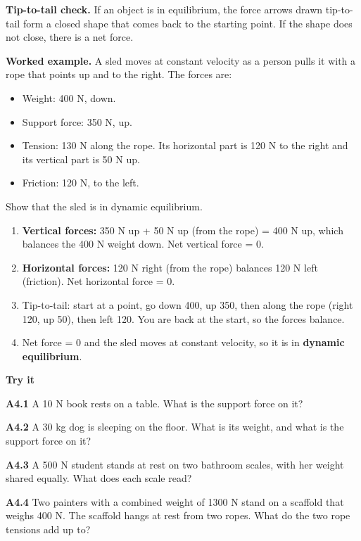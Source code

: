 \documentclass[
]{article}
\providecommand{\tightlist}{%
  \setlength{\itemsep}{0pt}\setlength{\parskip}{0pt}}
\begin{document}
\textbf{Tip-to-tail check.} If an object is in equilibrium, the force
arrows drawn tip-to-tail form a closed shape that comes back to the
starting point. If the shape does not close, there is a net force.

\textbf{Worked example.} A sled moves at constant velocity as a person
pulls it with a rope that points up and to the right. The forces are:

\begin{itemize}
\tightlist
\item
  Weight: 400 N, down.
\item
  Support force: 350 N, up.
\item
  Tension: 130 N along the rope. Its horizontal part is 120 N to the
  right and its vertical part is 50 N up.
\item
  Friction: 120 N, to the left.
\end{itemize}

Show that the sled is in dynamic equilibrium.

\begin{enumerate}
\def\labelenumi{\arabic{enumi}.}
\tightlist
\item
  \textbf{Vertical forces:} 350 N up + 50 N up (from the rope) = 400 N
  up, which balances the 400 N weight down. Net vertical force = 0.
\item
  \textbf{Horizontal forces:} 120 N right (from the rope) balances 120 N
  left (friction). Net horizontal force = 0.
\item
  Tip-to-tail: start at a point, go down 400, up 350, then along the
  rope (right 120, up 50), then left 120. You are back at the start, so
  the forces balance.
\item
  Net force = 0 and the sled moves at constant velocity, so it is in
  \textbf{dynamic equilibrium}.
\end{enumerate}

\textbf{Try it}

\textbf{A4.1} A 10 N book rests on a table. What is the support force on
it?

\textbf{A4.2} A 30 kg dog is sleeping on the floor. What is its weight,
and what is the support force on it?

\textbf{A4.3} A 500 N student stands at rest on two bathroom scales,
with her weight shared equally. What does each scale read?

\textbf{A4.4} Two painters with a combined weight of 1300 N stand on a
scaffold that weighs 400 N. The scaffold hangs at rest from two ropes.
What do the two rope tensions add up to?
\end{document}
